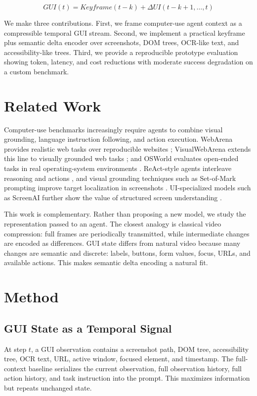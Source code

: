 \documentclass[11pt]{article}
\begin{document}
\[
GUI(t) = Keyframe(t-k) + \Delta UI(t-k+1,\ldots,t)
\]

We make three contributions. First, we frame computer-use agent context as a compressible temporal GUI stream. Second, we implement a practical keyframe plus semantic delta encoder over screenshots, DOM trees, OCR-like text, and accessibility-like trees. Third, we provide a reproducible prototype evaluation showing token, latency, and cost reductions with moderate success degradation on a custom benchmark.

\section{Related Work}

Computer-use benchmarks increasingly require agents to combine visual grounding, language instruction following, and action execution. WebArena provides realistic web tasks over reproducible websites \cite{zhou2023webarena}; VisualWebArena extends this line to visually grounded web tasks \cite{koh2024visualwebarena}; and OSWorld evaluates open-ended tasks in real operating-system environments \cite{xie2024osworld}. ReAct-style agents interleave reasoning and actions \cite{yao2023react}, and visual grounding techniques such as Set-of-Mark prompting improve target localization in screenshots \cite{yang2023setofmark}. UI-specialized models such as ScreenAI further show the value of structured screen understanding \cite{cheng2024screenai}.

This work is complementary. Rather than proposing a new model, we study the representation passed to an agent. The closest analogy is classical video compression: full frames are periodically transmitted, while intermediate changes are encoded as differences. GUI state differs from natural video because many changes are semantic and discrete: labels, buttons, form values, focus, URLs, and available actions. This makes semantic delta encoding a natural fit.

\section{Method}

\subsection{GUI State as a Temporal Signal}

At step $t$, a GUI observation contains a screenshot path, DOM tree, accessibility tree, OCR text, URL, active window, focused element, and timestamp. The full-context baseline serializes the current observation, full observation history, full action history, and task instruction into the prompt. This maximizes information but repeats unchanged state.
\end{document}
